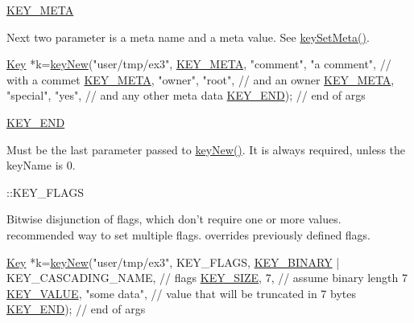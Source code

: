 \begin{DoxyItemize}
\item \hyperlink{group__key_gga91fb3178848bd682000958089abbaf40a040582834bb2d90049947d7ef74e87e2}{K\-E\-Y\-\_\-\-M\-E\-T\-A} \par
 Next two parameter is a meta name and a meta value. See \hyperlink{group__keymeta_gae1f15546b234ffb6007d8a31178652b9}{key\-Set\-Meta()}. 
\begin{DoxyCodeInclude}
\hyperlink{classkdb_1_1Key_a5679f5cae63caddd64a60388b9cc77fa}{Key} *k=\hyperlink{group__key_gad23c65b44bf48d773759e1f9a4d43b89}{keyNew}(\textcolor{stringliteral}{"user/tmp/ex3"},
        \hyperlink{group__key_gga91fb3178848bd682000958089abbaf40a040582834bb2d90049947d7ef74e87e2}{KEY\_META}, \textcolor{stringliteral}{"comment"}, \textcolor{stringliteral}{"a comment"},  \textcolor{comment}{// with a commet}
        \hyperlink{group__key_gga91fb3178848bd682000958089abbaf40a040582834bb2d90049947d7ef74e87e2}{KEY\_META}, \textcolor{stringliteral}{"owner"}, \textcolor{stringliteral}{"root"},         \textcolor{comment}{// and an owner}
        \hyperlink{group__key_gga91fb3178848bd682000958089abbaf40a040582834bb2d90049947d7ef74e87e2}{KEY\_META}, \textcolor{stringliteral}{"special"}, \textcolor{stringliteral}{"yes"},        \textcolor{comment}{// and any other meta data}
        \hyperlink{group__key_gga91fb3178848bd682000958089abbaf40aa8adb6fcb92dec58fb19410eacfdd403}{KEY\_END});                  \textcolor{comment}{// end of args}
\end{DoxyCodeInclude}

\item \hyperlink{group__key_gga91fb3178848bd682000958089abbaf40aa8adb6fcb92dec58fb19410eacfdd403}{K\-E\-Y\-\_\-\-E\-N\-D} \par
 Must be the last parameter passed to \hyperlink{group__key_gad23c65b44bf48d773759e1f9a4d43b89}{key\-New()}. It is always required, unless the {\ttfamily key\-Name} is 0.
\item \-::\-K\-E\-Y\-\_\-\-F\-L\-A\-G\-S \par
 Bitwise disjunction of flags, which don't require one or more values. recommended way to set multiple flags. overrides previously defined flags. 
\begin{DoxyCodeInclude}
\hyperlink{classkdb_1_1Key_a5679f5cae63caddd64a60388b9cc77fa}{Key} *k=\hyperlink{group__key_gad23c65b44bf48d773759e1f9a4d43b89}{keyNew}(\textcolor{stringliteral}{"user/tmp/ex3"},
        KEY\_FLAGS, \hyperlink{group__key_gga91fb3178848bd682000958089abbaf40a1ca18d4e094ae7487d35ecedda2235ff}{KEY\_BINARY} | KEY\_CASCADING\_NAME, \textcolor{comment}{// flags}
        \hyperlink{group__key_gga91fb3178848bd682000958089abbaf40a6d531b5c41445d19d0452eebdccbfa01}{KEY\_SIZE}, 7,                    \textcolor{comment}{// assume binary length 7}
        \hyperlink{group__key_gga91fb3178848bd682000958089abbaf40ac66e4a49d09212b79f5754ca6db5bd2e}{KEY\_VALUE}, \textcolor{stringliteral}{"some data"},                \textcolor{comment}{// value that will be
       truncated in 7 bytes}
        \hyperlink{group__key_gga91fb3178848bd682000958089abbaf40aa8adb6fcb92dec58fb19410eacfdd403}{KEY\_END});                        \textcolor{comment}{// end of args}
\end{DoxyCodeInclude}


\end{DoxyItemize}
